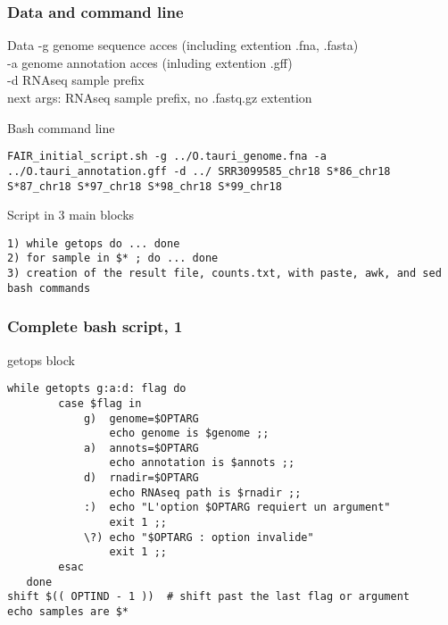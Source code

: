 \begin{frame}[containsverbatim]
\frametitle{Data and command line}
\begin{exampleblock}{Data}
-g genome sequence acces (including extention .fna, .fasta)\\
-a genome annotation acces (inluding extention .gff)\\
-d RNAseq sample prefix\\
next args: RNAseq sample prefix, no .fastq.gz extention
\end{exampleblock}
\begin{exampleblock}{Bash command line}
\begin{lstlisting}
FAIR_initial_script.sh -g ../O.tauri_genome.fna -a ../O.tauri_annotation.gff -d ../ SRR3099585_chr18 S*86_chr18 S*87_chr18 S*97_chr18 S*98_chr18 S*99_chr18
\end{lstlisting}
\end{exampleblock}
\begin{exampleblock}{Script in 3 main blocks}
\begin{lstlisting}
1) while getops do ... done   
2) for sample in $* ; do ... done   
3) creation of the result file, counts.txt, with paste, awk, and sed bash commands
\end{lstlisting}
\end{exampleblock}
\end{frame}
\begin{frame}[containsverbatim]
\frametitle{Complete bash script, 1}
\begin{exampleblock}{getops block}
\begin{lstlisting}
while getopts g:a:d: flag do
        case $flag in
            g)  genome=$OPTARG
                echo genome is $genome ;;
            a)  annots=$OPTARG
                echo annotation is $annots ;;
            d)  rnadir=$OPTARG
                echo RNAseq path is $rnadir ;;
            :)  echo "L'option $OPTARG requiert un argument"
                exit 1 ;;
            \?) echo "$OPTARG : option invalide"
                exit 1 ;;
        esac
   done
shift $(( OPTIND - 1 ))  # shift past the last flag or argument
echo samples are $*
\end{lstlisting}
\end{exampleblock}
\end{frame}
